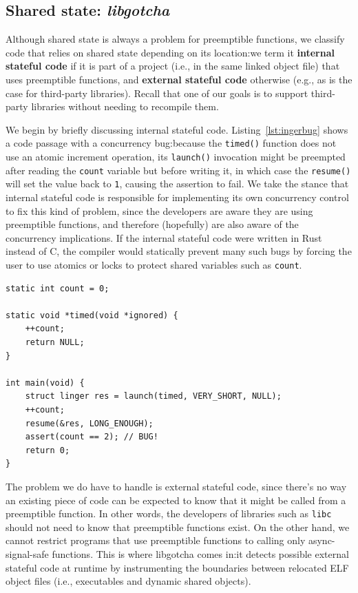 \subsection{Shared state: \textit{libgotcha}}
\label{sec:libgotcha}

Although shared state is always a problem for preemptible functions, we classify code
that relies on shared state depending on its location:\@ we term it \textbf{internal
stateful code} if it is part of a project (i.e., in the same linked object file)
that uses preemptible functions, and \textbf{external stateful code} otherwise (e.g.,
as is the case for third-party libraries).  Recall that one of our goals is to
support third-party libraries without needing to recompile them.

We begin by briefly discussing internal stateful code.  Listing~\ref{lst:ingerbug}
shows
a code passage with a concurrency bug:\@ because the \texttt{timed()} function does
not use an atomic increment operation, its \texttt{launch()} invocation might be
preempted after reading the \texttt{count} variable but before writing it, in which
case the \texttt{resume()} will set the value back to \texttt{1}, causing
the assertion to fail.  We take the stance that internal stateful code is responsible
for implementing its own concurrency control to fix this kind of problem, since the
developers are aware they are using preemptible functions, and therefore (hopefully)
are also aware of the concurrency implications.  If the internal stateful code were
written in Rust instead of C, the compiler would statically prevent many such bugs by
forcing the user to use atomics or locks to protect shared variables such as
\texttt{count}.

\begin{lstlisting}[label=lst:ingerbug,caption=Concurrency bug in internal stateful code]
static int count = 0;

static void *timed(void *ignored) {
	++count;
	return NULL;
}

int main(void) {
	struct linger res = launch(timed, VERY_SHORT, NULL);
	++count;
	resume(&res, LONG_ENOUGH);
	assert(count == 2); // BUG!
	return 0;
}
\end{lstlisting}

The problem we do have to handle is external stateful code, since there's no way an
existing piece of code can be expected to know that it might be called from a
preemptible function.  In other words, the developers of libraries such as
\texttt{libc} should not need to know that preemptible functions exist.  On the other
hand, we cannot restrict programs that use preemptible functions to calling only
async-signal-safe functions.  This is where libgotcha comes in:\@ it detects possible
external stateful code at runtime by instrumenting the
boundaries between relocated ELF object files (i.e., executables and dynamic shared
objects).

